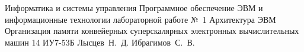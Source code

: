 \documentclass{bmstu}
\begin{document}
\makereporttitle
{Информатика и системы управления} %
{Программное обеспечение ЭВМ и информационные технологии} %
{лабораторной работе №~1} %
{Архитектура ЭВМ} %
{Организация памяти конвейерных суперскалярных электронных вычислительных машин} %
{14} %
{ИУ7-53Б} %
{Лысцев~Н.~Д.} %
{Ибрагимов~С.~В.} 

\maketableofcontents





% 
\end{document}
